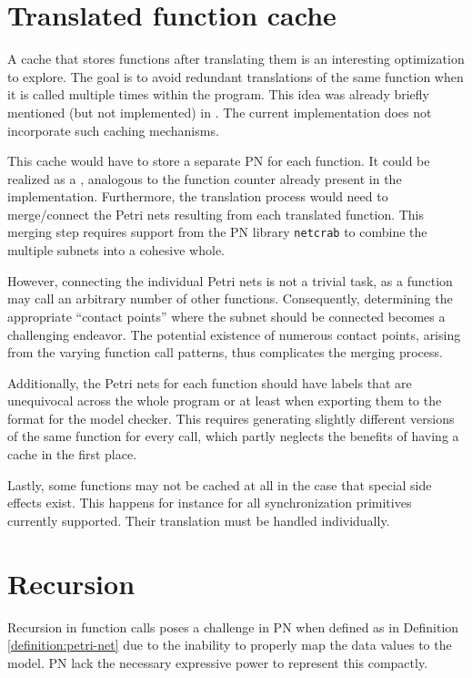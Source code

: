 \section{Translated function cache}
\label{sec:future-work-function-cache}

A cache that stores functions after translating them is
an interesting optimization to explore.
The goal is to avoid redundant translations of the same function
when it is called multiple times within the program.
This idea was already briefly mentioned (but not implemented) in \cite{meyer2020}.
The current implementation does not incorporate such caching mechanisms.

This cache would have to store a separate \acrshort{PN} for each function.
It could be realized as a ,
analogous to the function counter already present in the implementation.
Furthermore, the translation process would need to merge/connect
the Petri nets resulting from each translated function.
This merging step requires support from the \acrshort{PN} library \texttt{netcrab}
to combine the multiple subnets into a cohesive whole.

However, connecting the individual Petri nets is not a trivial task,
as a function may call an arbitrary number of other functions.
Consequently, determining the appropriate ``contact points''
where the subnet should be connected becomes a challenging endeavor.
The potential existence of numerous contact points,
arising from the varying function call patterns, thus complicates the merging process.

Additionally, the Petri nets for each function should have labels that are unequivocal
across the whole program or at least when exporting them to the format for the model checker.
This requires generating slightly different versions of the same function for every call,
which partly neglects the benefits of having a cache in the first place.

Lastly, some functions may not be cached at all in the case that special side effects exist.
This happens for instance for all synchronization primitives currently supported.
Their translation must be handled individually.

\section{Recursion}
\label{sec:future-work-recursion}

Recursion in function calls poses a challenge in \acrshort{PN}
when defined as in Definition \ref{definition:petri-net} due to the inability
to properly map the data values to the model.
\acrshort{PN} lack the necessary expressive power to represent this compactly.

